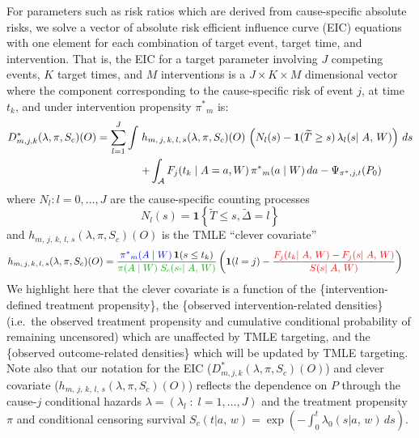 For parameters such as risk ratios which are derived from cause-specific absolute risks, we solve a vector of absolute risk efficient influence curve (EIC) equations with one element for each combination of target event, target time, and intervention. That is, the EIC for a target parameter involving \(J\) competing events, \(K\) target times, and \(M\) interventions is a \(J \times K\times M\) dimensional vector where the component corresponding to the cause-specific risk of event \({j}\), at time \(t_k\), and under intervention propensity \({\pi^*}_{m}\) is: \begin{align}
    D^*_{m, {j}, k}(\lambda, {\pi}, S_c)(O) = \sum_{{l}= 1}^{J} \int \; &h_{m,\, {j},\, k,\, {l},\, s}(\lambda, {\pi}, S_c)(O) \, \left(N_{{l}}(s) - {\mathbf{1}}(\widetilde T\geq s) \, \lambda_{l}(s {\mid A,\,{W}})\right) \, ds \label{eic} \\
    &{%
    + \int_{\mathcal{A}} F_{j}(t_k \mid A = a, {{W}})\,{\pi^*}_m(a \mid {{W}}) \, da - \Psi_{{\pi^*}, {j}, t}(P_0)}  \nonumber 
\end{align} where \(N_l : l = 0,\dots, J\) are the cause-specific counting processes \[N_l(s) = {\mathbf{1}}\left\{\widetilde T\leq s, {\tilde{\Delta}}= l\right\} \] and \(h_{m,\, {j},\, k,\, {l},\, s}(\lambda, {\pi}, S_c)(O)\) is the TMLE ``clever covariate'' \begin{align}
    h_{m,\, {j},\, k,\, {l},\, s}&(\lambda, {\pi}, S_c)(O) = \frac{{\color{blue}{\pi^*}_m(A \mid {{W}})\,} {\mathbf{1}}(s \leq t_k)}{{\color{green!70!black}{\pi}(A \mid {{W}}) \;S_c(s\text{-} {\mid A,\,{W}})}} \, \bigg({\mathbf{1}}({l}= {j}) - \frac{{\color{red}F_{j}(t_k {\mid A,\,{W}})} - {\color{red} F_{j}(s {\mid A,\,{W}})}}{{\color{red} S(s {\mid A,\,{W}})}}\bigg) \label{clevcov}
\end{align} We highlight here that the clever covariate is a function of the \{\color{blue}intervention-defined treatment propensity\}, the \{\color{green!70!black}observed intervention-related densities\} (i.e.~the observed treatment propensity and cumulative conditional probability of remaining uncensored) which are unaffected by TMLE targeting, and the \{\color{red}observed outcome-related densities\} which will be updated by TMLE targeting. Note also that our notation for the EIC (\(D^*_{m, {j}, k}(\lambda, {\pi}, S_c)(O)\)) and clever covariate (\(h_{m,\, {j},\, k,\, {l},\, s}(\lambda, {\pi}, S_c)(O)\)) reflects the dependence on \(P\) through the cause-\(j\) conditional hazards \(\lambda = (\lambda_l \;:\; l = 1, \dots, J)\) and the treatment propensity \({\pi}\) and conditional censoring survival \(S_c(t {\mid a,\,{w}}) = \exp\left(-\int^{t}_{0} \lambda_0(s {\mid a,\,{w}}) \, ds \right)\).

